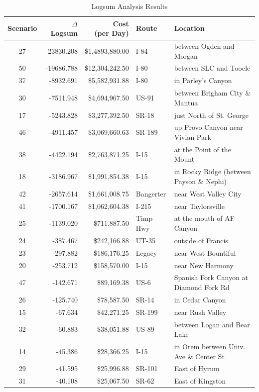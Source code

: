 \begin{table}


\caption{\label{tab:linkresults}Logsum Analysis Results}
\centering
\begin{tabular}[t]{crrll}
\toprule
Scenario & $\Delta$ Logsum & \makecell{Cost \\(per Day)} & Route & Location\\
\midrule
27 & -23830.208 & \$1,4893,880.00 & I-84 & between Ogden and Morgan\\
50 & -19686.788 & \$12,304,242.50 & I-80 & between SLC and Tooele\\
37 & -8932.691 & \$5,582,931.88 & I-80 & in Parley's Canyon\\
30 & -7511.948 & \$4,694,967.50 & US-91 & between Brigham City \& Mantua\\
17 & -5243.828 & \$3,277,392.50 & SR-18 & just North of St. George\\
46 & -4911.457 & \$3,069,660.63 & SR-189 & up Provo Canyon near Vivian Park\\
38 & -4422.194 & \$2,763,871.25 & I-15 & at the Point of the Mount\\
18 & -3186.967 & \$1,991,854.38 & I-15 & in Rocky Ridge (between Payson \& Nephi)\\
42 & -2657.614 & \$1,661,008.75 & Bangerter & near West Valley City\\
41 & -1700.167 & \$1,062,604.38 & I-215 & near Taylorsville\\
25 & -1139.020 & \$711,887.50 & Timp Hwy & at the mouth of AF Canyon\\
24 & -387.467 & \$242,166.88 & UT-35 & outside of Francis\\
23 & -297.882 & \$186,176.25 & Legacy & near West Bountiful\\
20 & -253.712 & \$158,570.00 & I-15 & near New Harmony\\
47 & -142.671 & \$89,169.38 & US-6 & Spanish Fork Canyon at Diamond Fork Rd\\
26 & -125.740 & \$78,587.50 & SR-14 & in Cedar Canyon\\
15 & -67.634 & \$42,271.25 & SR-199 & near Rush Valley\\
32 & -60.883 & \$38,051.88 & US-89 & between Logan and Bear Lake\\
14 & -45.386 & \$28,366.25 & I-15 & in Orem between Univ. Ave \& Center St\\
29 & -41.595 & \$25,996.88 & SR-101 & East of Hyrum\\
31 & -40.108 & \$25,067.50 & SR-62 & East of Kingston\\

\end{tabular}
\end{table}

